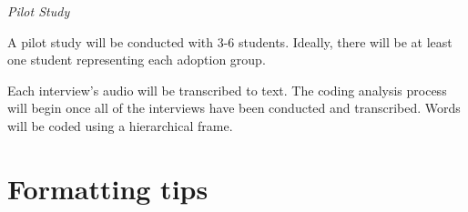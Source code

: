 \documentclass[english]{proposalnsf}
\begin{document}
{\em Pilot Study}

A pilot study will be conducted with 3-6 students. Ideally, there will be at least one student representing each adoption group. 

Each interview's audio will be transcribed to text. The coding analysis process will begin once all of the interviews have been conducted and transcribed. Words will be coded using a hierarchical frame.  




\appendix
\section{Formatting tips}
\end{document}
